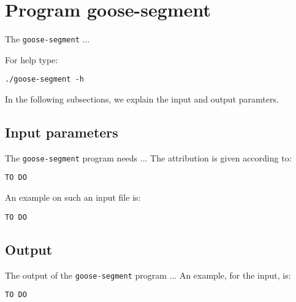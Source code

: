 \section{Program goose-segment}
The \texttt{goose-segment} ...

For help type:
\begin{lstlisting}
./goose-segment -h
\end{lstlisting}
In the following subsections, we explain the input and output paramters.

\subsection*{Input parameters}

The \texttt{goose-segment} program needs ...
The attribution is given according to:
\begin{lstlisting}
TO DO
\end{lstlisting}

An example on such an input file is:
\begin{lstlisting}
TO DO
\end{lstlisting}

\subsection*{Output}
The output of the \texttt{goose-segment} program ...
An example, for the input, is:
\begin{lstlisting}
TO DO
\end{lstlisting}